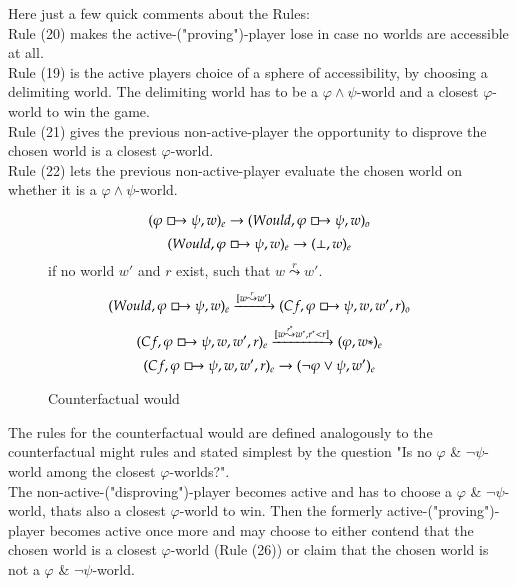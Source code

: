 \documentclass[a4paper,american]{paper}
\theoremstyle{definition}\newtheorem{definition}{Definition}
\begin{document}
	Here just a few quick comments about the Rules: \\
	Rule (20) makes the active-("proving")-player lose in case no worlds are accessible at all. \\
	Rule (19) is the active players choice of a sphere of accessibility, by choosing a delimiting world. The delimiting world has to be a $\varphi\wedge\psi$-world and a closest $\varphi$-world to win the game.\\
	Rule (21) gives the previous non-active-player the opportunity to disprove the chosen world is a closest $\varphi$-world. \\
	Rule (22) lets the previous non-active-player evaluate the chosen world on whether it is a $\varphi\wedge\psi$-world.
\begin{figure}[H]
	\centering
	\begin{equation}
		(\varphi\boxright\psi ,w)_e\rightarrow (Would,\varphi\boxright\psi ,w)_o
	\end{equation}
	\begin{equation}
		(Would,\varphi\boxright\psi ,w)_e\rightarrow (\bot ,w)_e
	\end{equation}
	if no world $w'$ and $r$ exist, such that $w\overset{r}{\leadsto}w'$.
	\begin{equation}
		(Would,\varphi\boxright\psi ,w)_e\xrightarrow{[w\overset{r}{\leadsto}w']} (Cf,\varphi\boxright\psi ,w,w',r)_o
	\end{equation}
	\begin{equation}
		(Cf,\varphi\boxright\psi ,w,w',r)_e\xrightarrow{[w\overset{r^*}{\leadsto}w^*,r^*< r]} (\varphi ,w*)_e
	\end{equation}
	\begin{equation}
		(Cf,\varphi\boxright\psi ,w,w',r)_e\rightarrow (\neg\varphi\vee\psi ,w')_e
	\end{equation}
	\caption{Counterfactual would}
	\label{fig:counterfactual_would_rules}
\end{figure}
	The rules for the counterfactual would are defined analogously to the counterfactual might rules and stated simplest by the question "Is no $\varphi$ \& $\neg\psi$-world among the closest $\varphi$-worlds?". \\
	The non-active-("disproving")-player becomes active and has to choose a $\varphi$ \& $\neg\psi$-world, thats also a closest $\varphi$-world to win. Then the formerly active-("proving")-player becomes active once more and may choose to either contend that the chosen world is a closest $\varphi$-world (Rule (26)) or claim that the chosen world is not a $\varphi$ \& $\neg\psi$-world. \\
\end{document}
